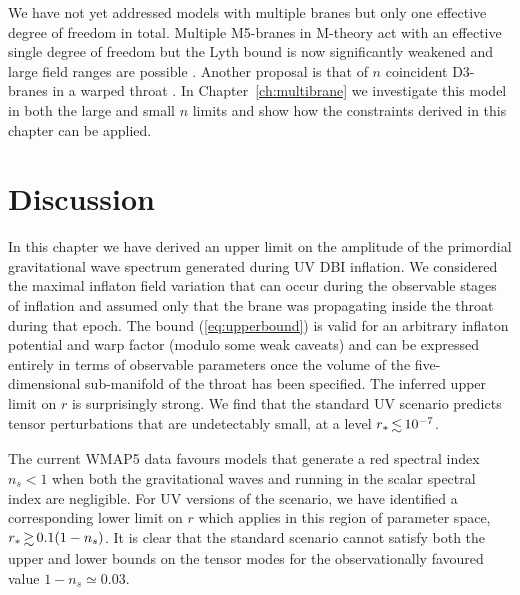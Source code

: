 We have not yet addressed models with multiple branes but only one effective
degree of freedom in total. Multiple M5-branes in M-theory act with an effective
single degree of freedom but the Lyth bound is now significantly weakened and large
field ranges are possible \cite{Krause:2007jr}. 
Another proposal is that of $n$ coincident D3-branes in a warped throat
\cite{thomasward, hltw,
Ward:2007gs}. In Chapter~\ref{ch:multibrane} we investigate this model in both
the large and small $n$ limits and show how the constraints derived in this
chapter can be applied.


% 
% 
% 
\section{Discussion}
\label{sec:conclusion-dbi}

In this chapter we have derived an upper limit on
the amplitude of the primordial gravitational wave spectrum
generated during UV DBI inflation. We considered   
the maximal inflaton field variation   
that can occur during the observable stages of inflation and assumed  
only that the brane was propagating inside the throat during that epoch. 
The bound (\ref{eq:upperbound}) is valid for an arbitrary inflaton potential and 
warp factor (modulo some weak caveats) and can be expressed 
entirely in terms of observable parameters once the volume of 
the five-dimensional sub-manifold of the throat has been specified. 
The inferred upper limit on $r$ is surprisingly strong. 
We find that the standard UV  
scenario predicts tensor perturbations that are undetectably small, 
at a level ${r_*} \, {\lsim} \, {10^{-7}}$. 

The current WMAP5 data 
favours models that generate a red spectral index $n_s<1$
when both the gravitational waves and running in the scalar 
spectral index are negligible. For UV versions of the scenario, 
we have identified a corresponding 
lower limit on $r$ which applies in this region of 
parameter space, $r_* \, \gsim \, 0.1 (1-n_s)$. It is clear that 
the standard scenario 
cannot satisfy both the upper and lower bounds 
on the tensor modes for the observationally favoured value 
$1-n_s \simeq 0.03$.


